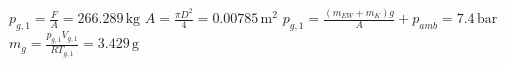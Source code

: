 \( p_{g,1} = \frac{F}{A} = 266.289 \, \text{kg} \)  
\( A = \frac{\pi D^2}{4} = 0.00785 \, \text{m}^2 \)  
\( p_{g,1} = \frac{(m_{EW} + m_K) g}{A} + p_{amb} = 7.4 \, \text{bar} \)  
\( m_g = \frac{p_{g,1} V_{g,1}}{R T_{g,1}} = 3.429 \, \text{g} \)